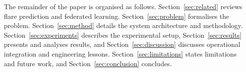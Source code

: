 The remainder of the paper is organised as follows.
Section~\ref{sec:related} reviews flare prediction and federated
learning. Section~\ref{sec:problem} formalises the problem.
Section~\ref{sec:method} details the system architecture and
methodology. Section~\ref{sec:experiments} describes the experimental
setup, Section~\ref{sec:results} presents and analyses results, and
Section~\ref{sec:discussion} discusses operational integration and
engineering lessons. Section~\ref{sec:limitations} states limitations
and future work, and Section~\ref{sec:conclusion} concludes.
